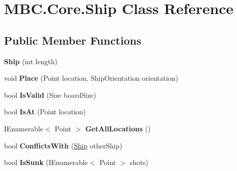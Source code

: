 \hypertarget{class_m_b_c_1_1_core_1_1_ship}{\section{M\-B\-C.\-Core.\-Ship Class Reference}
\label{class_m_b_c_1_1_core_1_1_ship}
}
\subsection*{Public Member Functions}
\begin{DoxyCompactItemize}
\item 
\hypertarget{class_m_b_c_1_1_core_1_1_ship_a2728c2c36920b0b340de375008a22eff}{{\bfseries Ship} (int length)}\label{class_m_b_c_1_1_core_1_1_ship_a2728c2c36920b0b340de375008a22eff}

\item 
\hypertarget{class_m_b_c_1_1_core_1_1_ship_a89511a2e24a6ce6f3346a685f6c20b7a}{void {\bfseries Place} (Point location, Ship\-Orientation orientation)}\label{class_m_b_c_1_1_core_1_1_ship_a89511a2e24a6ce6f3346a685f6c20b7a}

\item 
\hypertarget{class_m_b_c_1_1_core_1_1_ship_afbae95e084d6daeafea95e6c246b0fd4}{bool {\bfseries Is\-Valid} (Size board\-Size)}\label{class_m_b_c_1_1_core_1_1_ship_afbae95e084d6daeafea95e6c246b0fd4}

\item 
\hypertarget{class_m_b_c_1_1_core_1_1_ship_a1adf09a6c7bead42ffb4b478bd69ff1b}{bool {\bfseries Is\-At} (Point location)}\label{class_m_b_c_1_1_core_1_1_ship_a1adf09a6c7bead42ffb4b478bd69ff1b}

\item 
\hypertarget{class_m_b_c_1_1_core_1_1_ship_ad65098b265e9fa64b8fcbe5a298b2041}{I\-Enumerable$<$ Point $>$ {\bfseries Get\-All\-Locations} ()}\label{class_m_b_c_1_1_core_1_1_ship_ad65098b265e9fa64b8fcbe5a298b2041}

\item 
\hypertarget{class_m_b_c_1_1_core_1_1_ship_ac3f8bbb63b27d60b4ea3581141cdc5f9}{bool {\bfseries Conflicts\-With} (\hyperlink{class_m_b_c_1_1_core_1_1_ship}{Ship} other\-Ship)}\label{class_m_b_c_1_1_core_1_1_ship_ac3f8bbb63b27d60b4ea3581141cdc5f9}

\item 
\hypertarget{class_m_b_c_1_1_core_1_1_ship_aebf36ec312c5d6ef5c14c095444ee769}{bool {\bfseries Is\-Sunk} (I\-Enumerable$<$ Point $>$ shots)}\label{class_m_b_c_1_1_core_1_1_ship_aebf36ec312c5d6ef5c14c095444ee769}

\end{DoxyCompactItemize}
